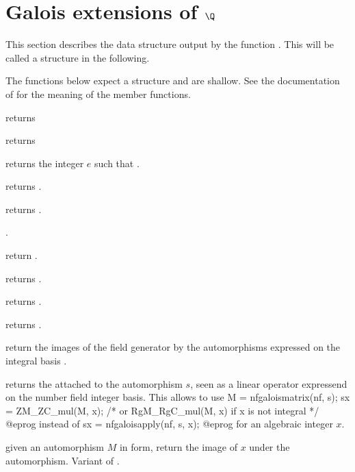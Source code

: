 
\section{Galois extensions of $\Q$}

This section describes the data structure output by the function
. This will be called a  structure in
the following.


The functions below expect a  structure and are shallow. See the
documentation of  for the meaning of the member functions.

 returns 

 returns 

 returns the integer $e$ such that
.

 returns .

 returns .

 .

 return .

 returns .

 returns .

 returns .


return the images of the field generator by the automorphisms
 expressed on the integral basis .

 returns the  attached to
the automorphism $s$, seen as a linear operator expressend on the number
field integer basis. This allows to use
\bprog
  M = nfgaloismatrix(nf, s);
  sx = ZM_ZC_mul(M, x);   /* or RgM_RgC_mul(M, x) if x is not integral */
@eprog\noindent
instead of
\bprog
  sx = nfgaloisapply(nf, s, x);
@eprog\noindent
for an algebraic integer $x$.

 given an automorphism
$M$ in  form, return the image of $x$ under the
automorphism. Variant of .

